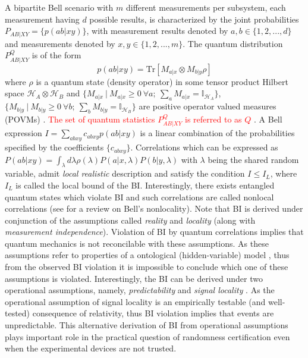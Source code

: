 \documentclass[doublecol,linenumbers]{epl2} %
\begin{document}
A bipartite Bell scenario with $m$ different measurements per subsystem, each measurement having $d$ possible results, is characterized by the joint probabilities $P_{AB|XY}=\{p(ab|xy)\}$, with measurement results denoted by $a,b\in \{1,2,...,d\}$ and measurements denoted by $x,y\in \{1,2,...,m\}$. The quantum distribution $P_{AB|XY}^Q$ is of the form
\begin{equation}\label{defQ}
p(ab|xy)=\mbox{Tr} [M_{a|x}\otimes M_{b|y} \rho]
\end{equation}
where $\rho$ is a quantum state (density operator) in some tensor product Hilbert space $\mathcal{H}_A\otimes \mathcal{H}_B$ and $\{M_{a|x}~|~M_{a|x}\ge 0~\forall a;~\sum_{a}M_{a|x}=\mathbb{I}_{\mathcal{H}_A}\}$, $\{M_{b|y}~|~M_{b|y}\ge 0~\forall b;~\sum_{b}M_{b|y}=\mathbb{I}_{\mathcal{H}_B}\}$ are positive operator valued measures (POVMs) \cite{Nielson}. \textcolor{red}{The set of quantum statistics $P_{AB|XY}^Q$ is referred to as $Q$  }. A Bell expression $I =\sum_{abxy}c_{abxy}p(ab|xy)$ is a linear combination of the probabilities specified by the coefficients $\{c_{abxy}\}$. Correlations which can be expressed as $P(ab|xy)=\int_{\lambda}d\lambda\rho(\lambda)P(a|x,\lambda)P(b|y,\lambda)$ with $\lambda$ being the shared random variable, admit {\em local realistic} description and satisfy the condition $I\le I_L$, where $I_L$ is called the local bound of the BI. Interestingly, there exists entangled quantum states which violate BI and such correlations are called nonlocal correlations (see \cite{Brunner} for a review on Bell's nonlocality). Note that BI is derived under conjunction of the assumptions called \emph{reality} and \emph{locality} (along with \emph{measurement independence}). Violation of BI by quantum correlations implies that quantum mechanics is not reconcilable with these assumptions. As these assumptions refer to properties of a ontological (hidden-variable) model \cite{Rudolph}, thus from the observed BI violation it is impossible to conclude which one of these assumptions is violated. Interestingly, the BI can be derived under two operational assumptions, namely, \emph{predictability} and \emph{signal locality} \cite{Cavalcanti}. As the operational assumption of signal locality is an empirically testable (and well-tested) consequence of relativity, thus BI violation implies that events are unpredictable. This alternative derivation of BI from operational assumptions plays important role in the practical question of randomness certification even when the experimental devices are not trusted. 
\end{document}
